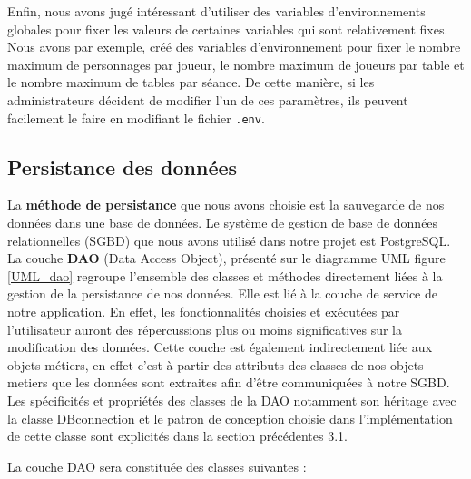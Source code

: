 \documentclass[11pt]{article}
\begin{document}
\bigbreak

Enfin, nous avons jugé intéressant d'utiliser des variables d'environnements globales pour fixer les valeurs de certaines variables qui sont relativement fixes. Nous avons par exemple, créé des variables d'environnement pour fixer le nombre maximum de personnages par joueur, le nombre maximum de joueurs par table et le nombre maximum de tables par séance. De cette manière, si les administrateurs décident de modifier l'un de ces paramètres, ils peuvent facilement le faire en modifiant le fichier \texttt{.env}.



\subsection{Persistance des données}


La \textbf{méthode de persistance} que nous avons choisie est la sauvegarde de nos données dans une base de données. Le système de gestion de base de données relationnelles (SGBD) que nous avons utilisé dans notre projet est PostgreSQL.\\

La couche \textbf{DAO} (Data Access Object), présenté sur le diagramme UML figure \ref{UML_dao} regroupe l'ensemble des classes et méthodes directement liées à la gestion de la persistance de nos données. Elle est lié à la couche de service de notre application. En effet, les fonctionnalités choisies et exécutées par l'utilisateur auront des répercussions plus ou moins significatives sur la modification des données. Cette couche est également indirectement liée aux objets métiers, en effet c'est à partir des attributs des classes de nos objets metiers que les données sont extraites afin d'être communiquées à notre SGBD.
Les spécificités et propriétés des classes de la DAO notamment son héritage avec la classe DBconnection et le patron de conception choisie dans l'implémentation de cette classe sont explicités dans la section précédentes 3.1.

La couche DAO sera constituée des classes suivantes :
\end{document}
